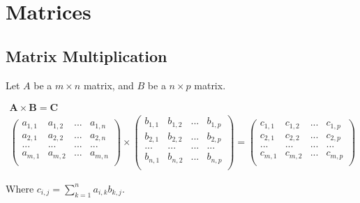 \documentclass{article}
\begin{document}
\section{Matrices}

\subsection{Matrix Multiplication}

Let $A$ be a $m \times n$ matrix, and $B$ be a $n \times p$ matrix.

\begin{align*}
    \mathbf{A} \times \mathbf{B} = \mathbf{C} \\
    \begin{pmatrix}
        a_{1,1} & a_{1,2} & ... & a_{1,n} \\
        a_{2,1} & a_{2,2} & ... & a_{2,n} \\
        ...     & ...     & ... & ...     \\
        a_{m,1} & a_{m,2} & ... & a_{m,n} \\
    \end{pmatrix}
    \times
    \begin{pmatrix}
        b_{1,1} & b_{1,2} & ... & b_{1,p} \\
        b_{2,1} & b_{2,2} & ... & b_{2,p} \\
        ...     & ...     & ... & ...     \\
        b_{n,1} & b_{n,2} & ... & b_{n,p} \\
    \end{pmatrix}
    =
    \begin{pmatrix}
        c_{1,1} & c_{1,2} & ... & c_{1,p} \\
        c_{2,1} & c_{2,2} & ... & c_{2,p} \\
        ...     & ...     & ... & ...     \\
        c_{m,1} & c_{m,2} & ... & c_{m,p} \\
    \end{pmatrix}
\end{align*}

Where $c_{i,j} = \sum_{k=1}^n a_{i,k} b_{k,j}$.
\end{document}
